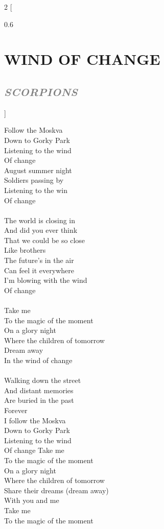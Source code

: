 \documentclass[100pt,a4paper]{report}
\newenvironment{song2}[2]
	{	
    	\begin{multicols*}{2}
		[
			\begin{spacing}{0.6}
				\section*{\LARGE\centering \MakeUppercase{\textbf{{#1}}}}
				\subsection*{\Large\centering \textit{\textcolor{gray}{\MakeUppercase{{#2}}}}}
			\end{spacing}
		]
		\Large
	}
	{
	\end{multicols*}
	\newpage
    }
\begin{document}
\begin{song2}{Wind of change}{Scorpions}
\noindent
Follow the Moskva\\
Down to Gorky Park\\
Listening to the wind\\
Of change\\
August summer night\\
Soldiers passing by\\
Listening to the win\\
Of change\\
\\
The world is closing in\\
And did you ever think\\
That we could be so close\\
Like brothers\\
The future's in the air\\
Can feel it everywhere\\
I'm blowing with the wind\\ 
Of change\\
\\
Take me\\
To the magic of the moment\\
On a glory night\\
Where the children of tomorrow\\
Dream away\\
In the wind of change\\
\\
Walking down the street\\
And distant memories\\
Are buried in the past\\ 
Forever\\
I follow the Moskva\\
Down to Gorky Park\\
Listening to the wind\\ 
Of change
\vfill
\columnbreak
\noindent
Take me\\ 
To the magic of the moment\\
On a glory night\\
Where the children of tomorrow\\ 
Share their dreams (dream away)\\
With you and me\\
Take me\\
To the magic of the moment\\

\end{song2}
\end{document}
